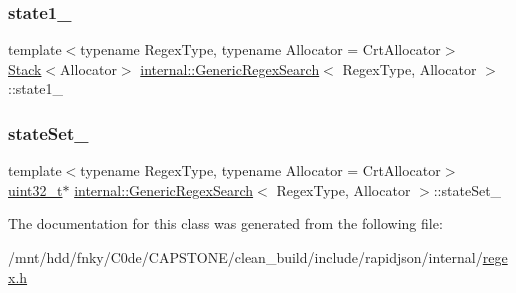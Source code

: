 \mbox{\label{classinternal_1_1GenericRegexSearch_a029a67ab36e5cb1b1394fc7a688c7cda}} 
\subsubsection{\texorpdfstring{state1\+\_\+}{state1\_}}
{\footnotesize\ttfamily template$<$typename Regex\+Type, typename Allocator = Crt\+Allocator$>$ \\
\hyperlink{classinternal_1_1Stack}{Stack}$<$Allocator$>$ \hyperlink{classinternal_1_1GenericRegexSearch}{internal\+::\+Generic\+Regex\+Search}$<$ Regex\+Type, Allocator $>$\+::state1\+\_\+\hspace{0.3cm}{\ttfamily [private]}}

\mbox{\label{classinternal_1_1GenericRegexSearch_a2f697f3edbd1e1f91d3f4535e494f4c2}} 
\subsubsection{\texorpdfstring{state\+Set\+\_\+}{stateSet\_}}
{\footnotesize\ttfamily template$<$typename Regex\+Type, typename Allocator = Crt\+Allocator$>$ \\
\hyperlink{stdint_8h_a435d1572bf3f880d55459d9805097f62}{uint32\+\_\+t}$\ast$ \hyperlink{classinternal_1_1GenericRegexSearch}{internal\+::\+Generic\+Regex\+Search}$<$ Regex\+Type, Allocator $>$\+::state\+Set\+\_\+\hspace{0.3cm}{\ttfamily [private]}}



The documentation for this class was generated from the following file\+:\begin{DoxyCompactItemize}
\item 
/mnt/hdd/fnky/\+C0de/\+C\+A\+P\+S\+T\+O\+N\+E/clean\+\_\+build/include/rapidjson/internal/\hyperlink{regex_8h}{regex.\+h}\end{DoxyCompactItemize}
